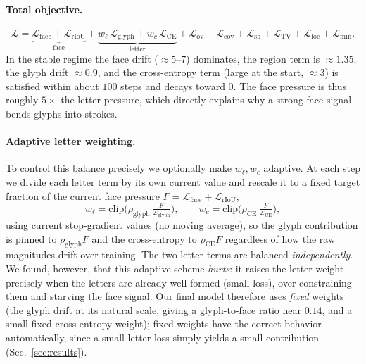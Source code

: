 \documentclass{article}
\begin{document}
\paragraph{Total objective.}
\begin{equation}
\label{eq:total}
   \mathcal{L} = \underbrace{\mathcal{L}_{\mathrm{face}}+\mathcal{L}_{\mathrm{rIoU}}}_{\text{face}}
   + \underbrace{w_{\ell}\,\mathcal{L}_{\mathrm{glyph}}+w_{c}\,\mathcal{L}_{\mathrm{CE}}}_{\text{letter}}
   + \mathcal{L}_{\mathrm{ov}}+\mathcal{L}_{\mathrm{cov}}+\mathcal{L}_{\mathrm{sh}}+\mathcal{L}_{\mathrm{TV}}+\mathcal{L}_{\mathrm{loc}}+\mathcal{L}_{\mathrm{min}}.
\end{equation}
In the stable regime the face drift ($\approx5\text{--}7$) dominates, the region term is
$\approx1.35$, the glyph drift $\approx0.9$, and the cross-entropy term (large at the start,
$\approx3$) is satisfied within about $100$ steps and decays toward $0$. The face pressure is thus
roughly $5\times$ the letter pressure, which directly explains why a strong face signal bends glyphs
into strokes.

\paragraph{Adaptive letter weighting.} To control this balance precisely we optionally make
$w_\ell,w_c$ adaptive. At each step we divide each letter term by its own current value and rescale it
to a fixed target fraction of the current face pressure $F=\mathcal{L}_{\mathrm{face}}+\mathcal{L}_{\mathrm{rIoU}}$,
\begin{equation}
   w_\ell = \mathrm{clip}\Big(\rho_{\mathrm{glyph}}\,\tfrac{F}{\mathcal{L}_{\mathrm{glyph}}}\Big),\qquad
   w_c = \mathrm{clip}\Big(\rho_{\mathrm{CE}}\,\tfrac{F}{\mathcal{L}_{\mathrm{CE}}}\Big),
\end{equation}
using current stop-gradient values (no moving average), so the glyph contribution is pinned to
$\rho_{\mathrm{glyph}}F$ and the cross-entropy to $\rho_{\mathrm{CE}}F$ regardless of how the raw
magnitudes drift over training. The two letter terms are balanced \emph{independently}. We found,
however, that this adaptive scheme \emph{hurts}: it raises the letter weight precisely when the letters
are already well-formed (small loss), over-constraining them and starving the face signal. Our final
model therefore uses \emph{fixed} weights (the glyph drift at its natural scale, giving a
glyph-to-face ratio near $0.14$, and a small fixed cross-entropy weight); fixed weights have the
correct behavior automatically, since a small letter loss simply yields a small contribution
(Sec.~\ref{sec:results}).
\end{document}
